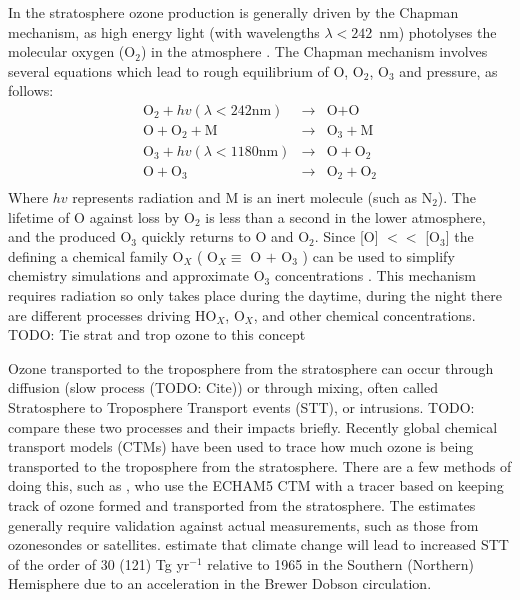     In the stratosphere ozone production is generally driven by the Chapman mechanism, as high energy light (with wavelengths $\lambda<242$~nm) photolyses the molecular oxygen (O$_2$) in the atmosphere \citep[][Chapter 3, section 2]{BrasseurJacob2017}.
    The Chapman mechanism involves several equations which lead to rough equilibrium of O, O$_2$, O$_3$ and pressure, as follows:
    \begin{eqnarray*}
      \textrm{O}_2 + hv(\lambda < 242 \text{nm}) & \rightarrow & \text{O} + \text{O} \\
      \text{O} + \text{O}_2 + \text{M} & \rightarrow & \text{O}_3 + \text{M} \\
      \text{O}_3 + hv(\lambda < 1180 \text{nm}) & \rightarrow & \text{O} + \text{O}_2 \\
      \text{O} + \text{O}_3 & \rightarrow & \text{O}_2 + \text{O}_2 \\
    \end{eqnarray*}
    Where $hv$ represents radiation and M is an inert molecule (such as N$_2$).
    The lifetime of O against loss by O$_2$ is less than a second in the lower atmosphere, and the produced O$_3$ quickly returns to O and O$_2$.
    Since [O] $<<$ [O$_3$] the defining a chemical family O$_X$ (  O$_X \equiv $ O $+$ O$_3$ ) can be used to simplify chemistry simulations and approximate O$_3$ concentrations \citep[][Chapter 3]{BrasseurJacob2017}.
    This mechanism requires radiation so only takes place during the daytime, during the night there are different processes driving HO$_X$, O$_X$, and other chemical concentrations.
    TODO: Tie strat and trop ozone to this concept
    
    Ozone transported to the troposphere from the stratosphere can occur through diffusion (slow process (TODO: Cite)) or through mixing, often called Stratosphere to Troposphere Transport events (STT), or intrusions.
    TODO: compare these two processes and their impacts briefly.
    Recently global chemical transport models (CTMs) have been used to trace how much ozone is being transported to the troposphere from the stratosphere.
    There are a few methods of doing this, such as \citet{Ojha2016}, who use the ECHAM5 CTM with a tracer based on keeping track of ozone formed and transported from the stratosphere.
    The estimates generally require validation against actual measurements, such as those from ozonesondes or satellites.
    \citet{Hegglin2009} estimate that climate change will lead to increased STT of the order of 30 (121) Tg yr$^{-1}$ relative to 1965 in the Southern (Northern) Hemisphere due to an acceleration in the Brewer Dobson circulation.
    

